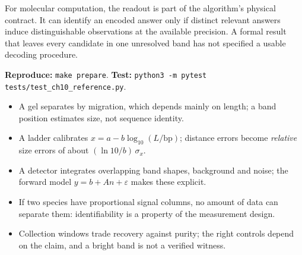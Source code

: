 For molecular computation, the readout is part of the algorithm's physical contract. It can identify an encoded answer only if distinct relevant answers induce distinguishable observations at the available precision. A formal result that leaves every candidate in one unresolved band has not specified a usable decoding procedure.

\textbf{Reproduce:} \texttt{make prepare}.
\textbf{Test:} \texttt{python3 -m pytest tests/test\_ch10\_reference.py}.

\begin{KeyIdeas}
\begin{itemize}\setlength{\itemsep}{2pt}
\item A gel separates by migration, which depends mainly on length; a band
position estimates size, not sequence identity.
\item A ladder calibrates $x=a-b\log_{10}(L/\mathrm{bp})$; distance errors become
\emph{relative} size errors of about $(\ln10/b)\,\sigma_x$.
\item A detector integrates overlapping band shapes, background and noise; the
forward model $y=b+An+\varepsilon$ makes these explicit.
\item If two species have proportional signal columns, no amount of data can
separate them: identifiability is a property of the measurement design.
\item Collection windows trade recovery against purity; the right controls depend
on the claim, and a bright band is not a verified witness.
\end{itemize}
\end{KeyIdeas}

